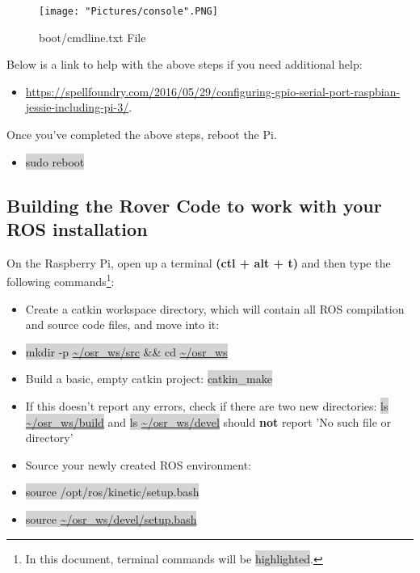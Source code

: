 \documentclass{article}
\begin{document}
\begin{figure}[H]
 	\centering
	\texttt{[image: "Pictures/console".PNG]}
 	\caption{boot/cmdline.txt File}
	\label{console}
\end{figure}

\noindent Below is a link to help with the above steps if you need additional help:
\begin{itemize}
	\item \href{https://spellfoundry.com/2016/05/29/configuring-gpio-serial-port-raspbian-jessie-including-pi-3/}{https://spellfoundry.com/2016/05/29/configuring-gpio-serial-port-raspbian-jessie-including-pi-3/}. 
\end{itemize}
\noindent Once you've completed the above steps, reboot the Pi.
\begin{itemize}
	\item[] \colorbox{lightgray}{sudo reboot}
\end{itemize}

\subsection{Building the Rover Code to work with your ROS installation}
On the Raspberry Pi, open up a terminal \textbf{(ctl + alt + t)} and then type the following commands\footnote{In this document, terminal commands will be \colorbox{lightgray}{highlighted}.}:

\begin{itemize}
	\item[] Create a catkin workspace directory, which will contain all ROS compilation and source code files, and move into it:
    \item[] \colorbox{lightgray}{mkdir -p \url{~/osr_ws/src} \&\& cd \url{~/osr\_ws}}
	\item[] Build a basic, empty catkin project: \colorbox{lightgray}{catkin\_make}
	\item[] If this doesn't report any errors, check if there are two new directories: \colorbox{lightgray}{ls \url{~/osr_ws/build}} and \colorbox{lightgray}{ls \url{~/osr_ws/devel}} should \textbf{not} report 'No such file or directory'
\end{itemize}

\begin{itemize}
	\item[] Source your newly created ROS environment: 
	\item[] \colorbox{lightgray}{source /opt/ros/kinetic/setup.bash}
	\item[] \colorbox{lightgray}{source \url{~/osr\_ws/devel/setup.bash}}
\end{itemize}
\end{document}
